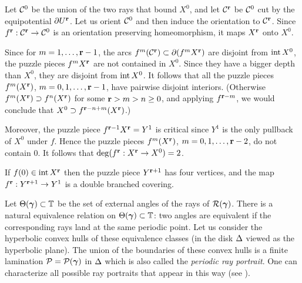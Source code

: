 \begin{pf}
    Let ${\mathcal C}^0$ be the union of the two rays that bound $X^0$,
and let ${\mathcal C}^{\mathbf{r}}  $ be ${\mathcal C}^0$ cut by the equipotential $\partial U^{\mathbf{r}}$.
Let us orient ${\mathcal C}^0$ and then induce the orientation to ${\mathcal C}^{\mathbf{r}} $.
    Since $f^{\mathbf{r}} : {\mathcal C}^{\mathbf{r}} \rightarrow {\mathcal C}^0$ is an orientation preserving homeomorphism, 
it maps $X^{\mathbf{r}} $ onto $X^0$. 

Since for $m=1,\dots, {\mathbf{r}} - 1$,  the arcs $f^m({\mathcal C}^{\mathbf{r}})\subset \partial (f^m X^{\mathbf{r}} )$ are disjoint  from
$\operatorname{int} X^0$, the puzzle pieces $f^m X^{\mathbf{r}} $ are not contained in $X^0$.
Since they have a bigger depth than $X^0$, they are disjoint from $\operatorname{int} X^0$.
It follows that all the puzzle pieces $f^m (X^{\mathbf{r}} )$, $m=0,1,\dots, {\mathbf{r}} -1$, 
have pairwise disjoint interiors. 
(Otherwise $f^m(X^{\mathbf{r}})\supset f^n (X^{\mathbf{r}})$ for some $ {\mathbf{r}}> m > n\geq 0$,
and applying $f^{{\mathbf{r}}-m}$, we would conclude that $X^0\supset f^{{\mathbf{r}}-n+m} (X^{\mathbf{r}})$.)    

Moreover, the puzzle piece  $f^{{\mathbf{r}}-1}X^{\mathbf{r}}=Y^1$ is  critical
since $Y^1$ is the only pullback of $X^0$ under $f$. 
Hence the puzzle pieces $f^m(X^{\mathbf{r}})$, $m=0,1,\dots, {\mathbf{r}}-2$, do not contain $0$. 
It follows that  $\deg(f^{\mathbf{r}} : X^{\mathbf{r}} \rightarrow X^0)=2$.
\end{pf}


\begin{cor}\label{renorm}
  If $f(0)\in \operatorname{int} X^{\mathbf{r}} $ then the puzzle piece $Y^{{\mathbf{r}}+1}$ has four vertices,
and the map $f^{\mathbf{r}} : Y^{{\mathbf{r}}+1}\rightarrow Y^1$ is a double branched covering.  
\end{cor}

   Let $\Theta({\mbox{\boldmath$\gamma$} })\subset {\mathbb T}$ be the set of external angles of the rays of ${\mathcal R}({\mbox{\boldmath$\gamma$} })$.
There is a natural equivalence relation on $\Theta({\mbox{\boldmath$\gamma$} })\subset {\mathbb T}$:
two angles are equivalent if the corresponding rays land at the same periodic point. 
Let us consider the hyperbolic convex hulls of these equivalence classes 
(in the disk $\Delta$ viewed as the hyperbolic plane). 
The union of the boundaries of these convex hulls 
is a  finite lamination ${\mathcal P}={\mathcal P}({\mbox{\boldmath$\gamma$} })$ in $\Delta$ which is also called the 
{\it periodic ray portrait}. One can characterize all possible ray portraits that appear in this way
(see \cite{M-rays}). 


